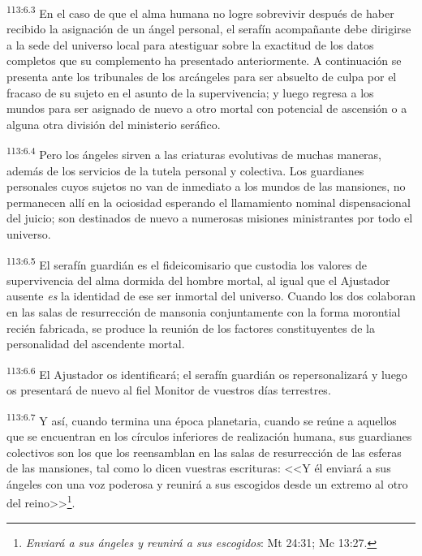 \documentclass[twoside, 11pt]{book}
\begin{document}
\par
\textsuperscript{113:6.3} En el caso de que el alma humana no logre sobrevivir después de haber recibido la asignación de un ángel personal, el serafín acompañante debe dirigirse a la sede del universo local para atestiguar sobre la exactitud de los datos completos que su complemento ha presentado anteriormente. A continuación se presenta ante los tribunales de los arcángeles para ser absuelto de culpa por el fracaso de su sujeto en el asunto de la supervivencia; y luego regresa a los mundos para ser asignado de nuevo a otro mortal con potencial de ascensión o a alguna otra división del ministerio seráfico.

\par
\textsuperscript{113:6.4} Pero los ángeles sirven a las criaturas evolutivas de muchas maneras, además de los servicios de la tutela personal y colectiva. Los guardianes personales cuyos sujetos no van de inmediato a los mundos de las mansiones, no permanecen allí en la ociosidad esperando el llamamiento nominal dispensacional del juicio; son destinados de nuevo a numerosas misiones ministrantes por todo el universo.

\par
\textsuperscript{113:6.5} El serafín guardián es el fideicomisario que custodia los valores de supervivencia del alma dormida del hombre mortal, al igual que el Ajustador ausente \textit{es} la identidad de ese ser inmortal del universo. Cuando los dos colaboran en las salas de resurrección de mansonia conjuntamente con la forma morontial recién fabricada, se produce la reunión de los factores constituyentes de la personalidad del ascendente mortal.

\par
\textsuperscript{113:6.6} El Ajustador os identificará; el serafín guardián os repersonalizará y luego os presentará de nuevo al fiel Monitor de vuestros días terrestres.

\par
\textsuperscript{113:6.7} Y así, cuando termina una época planetaria, cuando se reúne a aquellos que se encuentran en los círculos inferiores de realización humana, sus guardianes colectivos son los que los reensamblan en las salas de resurrección de las esferas de las mansiones, tal como lo dicen vuestras escrituras: <<Y él enviará a sus ángeles con una voz poderosa y reunirá a sus escogidos desde un extremo al otro del reino>>\footnote{\textit{Enviará a sus ángeles y reunirá a sus escogidos}: Mt 24:31; Mc 13:27.}.
\end{document}
